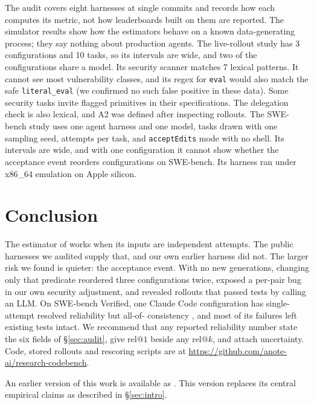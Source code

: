 \documentclass[11pt,a4paper]{article}
\makeatletter
\newcommand{\relk}[1]{\mathrm{rel}@#1}
\makeatother
\begin{document}
The audit covers eight harnesses at single commits and records how each computes its metric, not how leaderboards built on them are reported. The simulator results show how the estimators behave on a known data-generating process; they say nothing about production agents. The live-rollout study has 3 configurations and 10 tasks, so its intervals are wide, and two of the configurations share a model. Its security scanner matches 7 lexical patterns. It cannot see most vulnerability classes, and its regex for \texttt{eval} would also match the safe \texttt{literal\_eval} (we confirmed no such false positive in these data). Some security tasks invite flagged primitives in their specifications. The delegation check is also lexical, and A2 was defined after inspecting rollouts. The SWE-bench study uses one agent harness and one model, \sweNTasks{} tasks drawn with one sampling seed, \sweAttempts{} attempts per task, and \texttt{acceptEdits} mode with no shell. Its intervals are wide, and with one configuration it cannot show whether the acceptance event reorders configurations on SWE-bench. Its harness ran under x86\_64 emulation on Apple silicon.

\section{Conclusion}
\label{sec:conclusion}

The estimator of \citet{chen2021codex} works when its inputs are independent attempts. The public harnesses we audited supply that, and our own earlier harness did not. The larger risk we found is quieter: the acceptance event. With no new generations, changing only that predicate reordered three configurations twice, exposed a per-pair bug in our own security adjustment, and revealed rollouts that passed tests by calling an LLM. On SWE-bench Verified, one Claude Code configuration has single-attempt resolved reliability \sweSonnetResolvedRelone{} but all-of-\sweAttempts{} consistency \sweSonnetResolvedPassk{}, and most of its failures left existing tests intact. We recommend that any reported reliability number state the six fields of \S\ref{sec:audit}, give $\relk{1}$ beside any $\relk{k}$, and attach uncertainty. Code, stored rollouts and rescoring scripts are at \url{https://github.com/anote-ai/research-codebench}.

An earlier version of this work is available as \citet{jiang2026beyond}. This version replaces its central empirical claims as described in \S\ref{sec:intro}.
\end{document}
